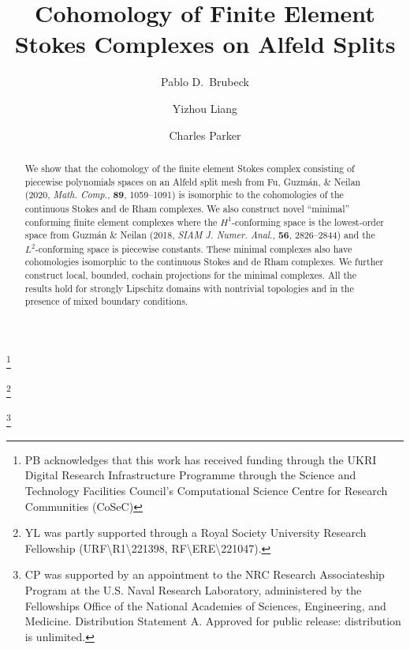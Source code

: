 \documentclass{mcom-l}
\newif\iflinenumbers
\theoremstyle{definition}
\theoremstyle{remark}
\numberwithin{equation}{section}
\begin{document}
\title[Cohomology of FEM Stokes Complex]{%
  Cohomology of Finite Element Stokes Complexes on Alfeld Splits}


\author[P.~D.~Brubeck]{Pablo D.\ Brubeck}
\address{Mathematical Institute,
University of Oxford,
Oxford, UK}
\thanks{PB acknowledges that this work has received funding through the UKRI Digital
Research Infrastructure Programme through the Science and Technology Facilities
Council's Computational Science Centre for Research Communities (CoSeC)}

\author[Y.~Liang]{Yizhou Liang}
\address{Mathematical Institute,
	University of Oxford,
	Oxford, UK}
\thanks{YL was partly supported through a Royal Society 
University Research Fellowship (URF\textbackslash R1\textbackslash 221398, 
RF\textbackslash ERE\textbackslash 221047).}

\author[C.~Parker]{Charles Parker}
\address{U.S. Naval Research Laboratory,
	4555 Overlook Ave SW, Washington, DC 20375}
\thanks{CP was supported by an appointment to the NRC Research
Associateship Program at the U.S. Naval Research Laboratory, 
administered by the Fellowships Office of the National Academies of Sciences, 
Engineering, and Medicine. Distribution Statement A.  Approved for public release: distribution is unlimited.}


\date{}

\dedicatory{}

\iflinenumbers
	\linenumbers
\fi

\begin{abstract}
  We show that the cohomology of the finite element Stokes complex consisting 
	of piecewise polynomials spaces on an Alfeld split mesh from 
	Fu, Guzm\'{a}n, \& Neilan 
	(2020, \textit{Math. Comp.}, \textbf{89}, 1059--1091) is 
	isomorphic to the cohomologies of the continuous Stokes and de Rham 
	complexes. 
	We also construct novel ``minimal'' conforming finite element complexes 
	where the $H^1$-conforming space is the lowest-order space from 
	Guzm\'{a}n \& Neilan 
	(2018, \textit{SIAM J. Numer. Anal.}, \textbf{56}, 2826--2844)
	and the $L^2$-conforming space is piecewise constants.
	These minimal complexes also have cohomologies isomorphic to the 
	continuous Stokes and de Rham complexes. We further construct local, 
	bounded, cochain projections for the minimal complexes.
	All the results hold for strongly Lipschitz domains with nontrivial 
	topologies and in the presence of mixed boundary conditions. 
\end{abstract}
\end{document}
